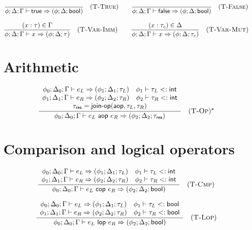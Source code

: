 $$\frac{}{\phi; \Delta; \Gamma \vdash \textsf{true} \Rightarrow (\phi; \Delta; \textsf{bool})} \quad (\textsc{T-True})
  \qquad
  \frac{}{\phi; \Delta; \Gamma \vdash \textsf{false} \Rightarrow (\phi; \Delta; \textsf{bool})} \quad (\textsc{T-False})$$

$$\frac{(x: \tau) \in \Gamma}{\phi; \Delta; \Gamma \vdash x \Rightarrow (\phi; \Delta; \tau)} \quad (\textsc{T-Var-Imm})
  \qquad
  \frac{(x: \tau_c) \in \Delta}{\phi; \Delta; \Gamma \vdash x \Rightarrow (\phi; \Delta; \tau_c)} \quad (\textsc{T-Var-Mut})$$

\section*{Arithmetic}

$$
  \frac{
    \begin{array}{c}
      \phi_0; \Delta_0; \Gamma \vdash e_L \Rightarrow (\phi_1; \Delta_1; \tau_L) \quad \phi_1 \vdash \tau_L <: \textsf{int} \\
      \phi_1; \Delta_1; \Gamma \vdash e_R \Rightarrow (\phi_2; \Delta_2; \tau_R) \quad \phi_2 \vdash \tau_R <: \textsf{int} \\
      \tau_\textsf{res} = \textsf{join-op}(\textsf{aop}, \tau_L, \tau_R)
    \end{array}
  }{
    \phi_0; \Delta_0; \Gamma \vdash e_L \textsf{ aop } e_R \Rightarrow (\phi_2; \Delta_2; \tau_\textsf{res})
  } \quad (\textsc{T-Op})^\star
$$

\section*{Comparison and logical operators}

$$
  \frac{
    \begin{array}{c}
      \phi_0; \Delta_0; \Gamma \vdash e_L \Rightarrow (\phi_1; \Delta_1; \tau_L) \quad \phi_1 \vdash \tau_L <: \textsf{int} \\
      \phi_1; \Delta_1; \Gamma \vdash e_R \Rightarrow (\phi_2; \Delta_2; \tau_R) \quad \phi_2 \vdash \tau_R <: \textsf{int}
    \end{array}
  }{
    \phi_0; \Delta_0; \Gamma \vdash e_L \textsf{ cop } e_R \Rightarrow (\phi_2; \Delta_2; \textsf{bool})
  } \quad (\textsc{T-Cmp})
$$

$$
  \frac{
    \begin{array}{c}
      \phi_0; \Delta_0; \Gamma \vdash e_L \Rightarrow (\phi_1; \Delta_1; \tau_L) \quad \phi_1 \vdash \tau_L <: \textsf{bool} \\
      \phi_1; \Delta_1; \Gamma \vdash e_R \Rightarrow (\phi_2; \Delta_2; \tau_R) \quad \phi_2 \vdash \tau_R <: \textsf{bool}
    \end{array}
  }{
    \phi_0; \Delta_0; \Gamma \vdash e_L \textsf{ lop } e_R \Rightarrow (\phi_2; \Delta_2; \textsf{bool})
  } \quad (\textsc{T-Lop})
$$

